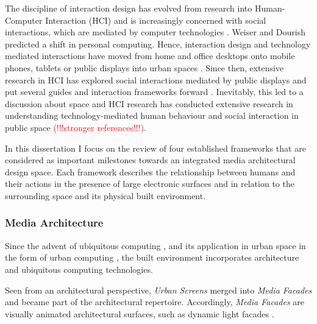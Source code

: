 The discipline of interaction design has evolved from research into Human-Computer Interaction (HCI) and is increasingly concerned with social interactions, which are mediated by computer technologies \cite{Hornecker_2006}. 
Weiser \cite{Weiser_1991} and Dourish \cite{Dourish_2004} predicted a shift in personal computing. Hence, interaction design and technology mediated interactions have moved from home and office desktops onto mobile phones, tablets or public displays into urban spaces \cite{Rogers_2011}. 
Since then, extensive research in HCI has explored social interactions mediated by public displays and put several guides \cite{Muller_2010} and interaction frameworks forward \cite{Vogel_2004}. 
Inevitably, this led to a discussion about space and HCI research has conducted extensive research in understanding technology-mediated human behaviour and social interaction in public space \cite{Fischer_2012, Akpan_2013} \textcolor{red}{(!!!stronger references!!!)}.

In this dissertation I focus on the review of four established frameworks \cite{Brignull_2003, Reeves_2011, Michelis_2011, Fischer_2012} that are considered as important milestones towards an integrated media architectural design space. Each framework describes the relationship between humans and their actions in the presence of large electronic surfaces and in relation to the surrounding space and its physical built environment. 


\subsubsection*{Media Architecture}

Since the advent of ubiquitous computing \cite{Weiser_1991}, and its application in urban space in the form of urban computing \cite{Kindberg_2007}, the built environment incorporates architecture and ubiquitous computing technologies.

Seen from an architectural perspective, \textit{Urban Screens} merged into \textit{Media Facades} and became part of the architectural repertoire. Accordingly, \textit{Media Facades} are visually animated architectural surfaces, such as dynamic light facades \cite{Virilio_1991, Fatah_2006, McQuire_2009}.


